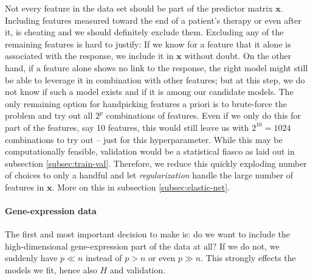 Not every feature in the data set should be part of the predictor matrix $\mathbf{x}$. Including 
features measured toward the end of a patient's therapy or even after it, is cheating and we 
should definitely exclude them. Excluding any of the remaining features is hard to justify: If we 
know for a feature that it alone is associated with the response, we include it in $\mathbf{x}$ 
without doubt.
On the other hand, if a feature alone shows no link to the response, the right model might still be 
able to leverage it in combination with other features; but at this step, we do not know if such 
a model exists and if it is among our candidate models. The only remaining option for handpicking 
features a priori is to brute-force the problem and try out all $2^p$ combinations of features.
Even if we only do this for part of the features, say \num{10} features, this would still
leave us with $2^{10} = 1024$ combinations to try out -- just for this hyperparameter. While this 
may be computationally feasible, validation would be a statistical fiasco as laid out in subsection 
\ref{subsec:train-val}. Therefore, we reduce this quickly exploding number of choices to only 
a handful and let \textit{regularization} handle the large number of features in $\mathbf{x}$. More 
on this in subsection \ref{subsec:elastic-net}.

\paragraph{Gene-expression data}
The first and most important decision to make is: do we want to include the high-dimensional
gene-expression part of the data at all? If we do not, we suddenly have $p \ll n$ instead of 
$p > n$ or even $p \gg n$. This strongly effects the models we fit, hence also $H$ and 
validation.

